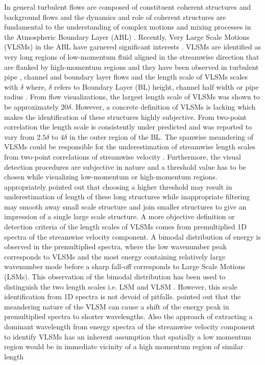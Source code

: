 \documentclass{amsart}
\begin{document}
\label{intro} 
In general turbulent flows  are composed of constituent coherent structures and background flows \citep{hussain_1986_jfm} and the dynamics and role of coherent structures are fundamental to the understanding of complex motions and mixing processes in the Atmospheric Boundary Layer (ABL) \citep{lewalle_flowTurbCom_00,Fiedler_PAeroSci_1988}. Recently, Very Large Scale Motions (VLSMs) in the ABL have garnered significant interests \citep[eg.][]{Chinthaka_blm_2017,kerherv_roux_etfs_2017}. VLSMs  are identified as  very long regions of low-momentum fluid aligned in the streamwise direction that are flanked by high-momentum regions and they have been observed in turbulent pipe \citep{guala_adrian_jfm2006, kim_adrian_pof99, monty_jfm_07}, channel \citep{guala_adrian_jfm2006, monty_jfm_07, lee_sung_jfm_14} and boundary layer flows \citep{fang2015blm,hutchins_marusic_jfm2007} and the length scale of VLSMs scales with $\delta$ where, $\delta$ refers to Boundary Layer (BL)  height, channel half width or pipe radius \citep{chung_jfm_10_large,monty_jfm_07}. From flow visualizations, the largest length scale of VLSMs was shown to be approximately $20\delta$. However, a concrete definition of VLSMs is lacking which makes the identification of these structures highly subjective. From two-point correlation the length scale is consistently under predicted and was reported to vary from $2.5\delta$ to $4\delta$ in the outer region of the BL. The spanwise meandering of VLSMs could be responsible for the underestimation of streamwise length scales from two-point correlations of streamwise velocity \citep{hutchins_marusic_jfm2007}. Furthermore, the visual detection procedures are subjective in nature and a threshold value has to be chosen while visualizing low-momentum or high-momentum regions. \citet{dennis_nickels_jfm2011} appropriately pointed out that choosing a higher threshold may result in underestimation of length of these long structures while inappropriate filtering may smooth away small scale structure and join smaller structures to give an impression of a single large scale structure. A more objective definition or detection criteria of the length scales of VLSMs comes from premultiplied 1D spectra of the streamwise velocity component. A bimodal distribution of energy is observed in the premultiplied spectra, where the low wavenumber peak corresponds to VLSMs and the most energy containing relatively large wavenumber mode before a sharp fall-off corresponds to Large Scale Motions (LSMs). This observation of the bimodal distribution has been used to distinguish the two length scales i.e. LSM and VLSM \citep{kim_adrian_pof99,balakumar_adrian_ptrs_07,guala_adrian_jfm2006}. However, this scale identification from 1D spectra is not devoid of pitfalls. \citet{hutchins_marusic_jfm2007}  pointed out that the meandering nature of the VLSM can cause a shift of the energy peak in premultiplied spectra to shorter wavelengths. Also the approach of extracting a dominant wavelength from energy spectra of the streamwise velocity component to identify VLSMs has an inherent assumption \citep{baltzer_jfm_13} that spatially a low momentum region would be in immediate vicinity of a high momentum region of similar length 
\end{document}
